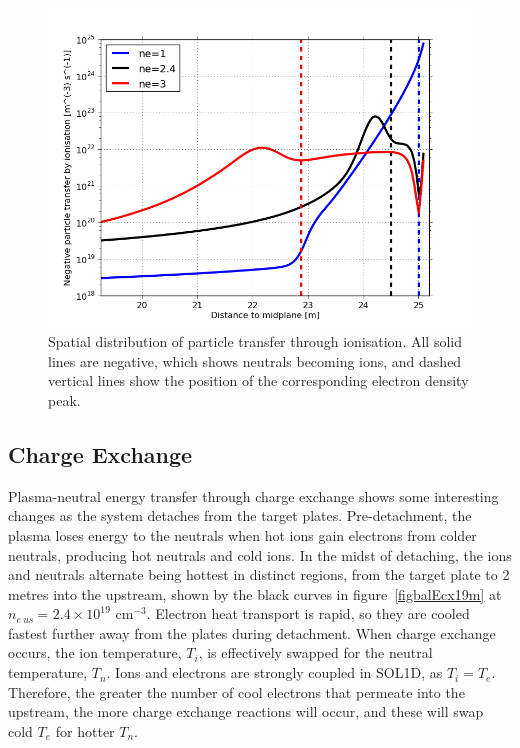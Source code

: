 \documentclass[12pt]{article}  %
\providecommand{\noNe}[1]{{${#1}\times 10^{19}$ cm$^{-3}$}} %
\providecommand{\neus}{$n_{e~us}~$} %
\begin{document}
\begin{figure}
\includegraphics[scale=0.5]{Figures/sol1d/balSizthick20m.png}
\centering
\caption{Spatial distribution of particle transfer through ionisation. All solid lines are negative, which shows neutrals becoming ions, and dashed vertical lines show the position of the corresponding electron density peak.}\label{figbalSizthick20m}
\end{figure}


\subsection{Charge Exchange}\label{ssecCX}
Plasma-neutral energy transfer through charge exchange shows some interesting changes as the system detaches from the target plates. Pre-detachment, the plasma loses energy to the neutrals when hot ions gain electrons from colder neutrals, producing hot neutrals and cold ions. In the midst of detaching, the ions and neutrals alternate being hottest in distinct regions, from the target plate to 2 metres into the upstream, shown by the black curves in figure~\ref{figbalEcx19m} at \neus = \noNe{2.4}. Electron heat transport is rapid, so they are cooled fastest further away from the plates during detachment. When charge exchange occurs, the ion temperature, $T_i$, is effectively swapped for the neutral temperature, $T_n$. Ions and electrons are strongly coupled in SOL1D, as $T_i = T_e$. Therefore, the greater the number of cool electrons that permeate into the upstream, the more charge exchange reactions will occur, and these will swap cold $T_e$ for hotter $T_n$.
\end{document}
